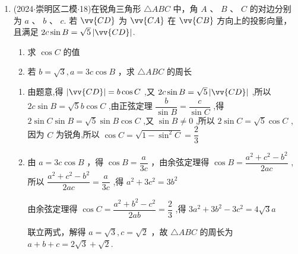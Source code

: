 \begin{enumerate}
\begin{jieda}
\begin{enumerate}
            $a = \dfrac{sinA}{\sqrt{3}sin\left(B + \dfrac{\pi}{6}\right)} = \dfrac{1}{2sin\left(B + \dfrac{\pi}{6}\right)}$，$B+\dfrac{\pi}{6} \in \left(\dfrac{\pi}{6}, \dfrac{5\pi}{6}\right)$，故$a \in \left[\dfrac{1}{2}, 1\right)$
        \end{enumerate}
    \end{jieda}

    \item (2024$\cdot$崇明区二模$\cdot$18)在锐角三角形 $\bigtriangleup  {ABC}$ 中，角 $A$ 、 $B$ 、 $C$ 的对边分别为 $a$ 、 $b$ 、 $c$. 若 $\vv{CD}$ 为 $\vv{CA}$ 在 $\vv{CB}$ 方向上的投影向量，且满足 ${2c}\sin B = \sqrt{5}\left| \vv{CD}\right|$.
    \begin{enumerate}
        \item 求 $\cos C$ 的值
        \item 若 $b = \sqrt{3},a = {3c}\cos B$ ，求 $\bigtriangleup  {ABC}$ 的周长
    \end{enumerate}
    \begin{jieda}
        \begin{enumerate}
            \item 由题意,得 $\left| \vv{CD}\right|  = b\cos C$ ,又 ${2c}\sin B = \sqrt{5}\left| \vv{CD}\right|$ ,所以 ${2c}\sin B = \sqrt{5}b\cos C$ ,由正弦定理 $\dfrac{b}{\sin B} = \dfrac{c}{\sin C}$ ,得 $2\sin C\sin B =  \sqrt{5}\sin B\cos C$ ,又 $\sin B \neq  0$ ,所以 $2\sin C = \sqrt{5}\cos C$ ,因为 $C$ 为锐角,所以 $\cos C = \sqrt{1 - {\sin }^{2}C} = \dfrac{2}{3}$
            \item 由 $a = {3c}\cos B$ ，得 $\cos B = \dfrac{a}{3c}$ ，由余弦定理得 $\cos B =  \dfrac{{a}^{2} + {c}^{2} - {b}^{2}}{2ac}$ ,所以 $\dfrac{{a}^{2} + {c}^{2} - {b}^{2}}{2ac} = \dfrac{a}{3c}$ ,得 ${a}^{2} + 3{c}^{2} = 3{b}^{2}$
            
            由余弦定理得 $\cos C = \dfrac{{a}^{2} + {b}^{2} - {c}^{2}}{2ab} = \dfrac{2}{3}$ ,得 $3{a}^{2} + 3{b}^{2} - 3{c}^{2} =  4\sqrt{3}a$
            
            联立两式，解得 $a = \sqrt{3},c = \sqrt{2}$ ，故 $\bigtriangleup  {ABC}$ 的周长为 $a + b + c = 2\sqrt{3} + \sqrt{2}$.
        \end{enumerate}
    \end{jieda}


\end{enumerate}
